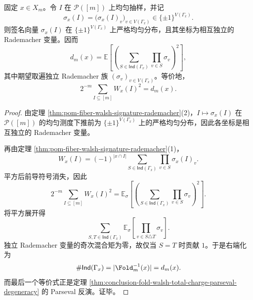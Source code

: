 \begin{theorem}\label{thm:conclusion-fold-rademacher-second-moment-degeneracy}
固定 \(x\in X_m\)。令 \(I\) 在 \(\mathcal P([m])\) 上均匀抽样，并记
\[
\sigma_x(I)=\bigl(\sigma_x(I)_v\bigr)_{v\in V(\Gamma_x)}\in\{\pm 1\}^{V(\Gamma_x)}.
\]
则签名向量 \(\sigma_x(I)\) 在 \(\{\pm 1\}^{V(\Gamma_x)}\) 上严格均匀分布，且其坐标为相互独立的 Rademacher 变量。因而
\[
\boxed{\;
d_m(x)
=
\mathbb E\!\left[
\left(
\sum_{S\in \mathsf{Ind}(\Gamma_x)}
\prod_{v\in S}\sigma_v
\right)^2
\right],\;}
\]
其中期望取遍独立 Rademacher 族 \((\sigma_v)_{v\in V(\Gamma_x)}\)。等价地，
\[
2^{-m}\sum_{I\subseteq[m]}W_x(I)^2=d_m(x).
\]
\end{theorem}
\begin{proof}
由定理 \ref{thm:pom-fiber-walsh-signature-rademacher}(2)，\(I\mapsto \sigma_x(I)\) 在 \(\mathcal P([m])\) 的均匀测度下推前为 \(\{\pm 1\}^{V(\Gamma_x)}\) 上的严格均匀分布，因此各坐标是相互独立的 Rademacher 变量。

再由定理 \ref{thm:pom-fiber-walsh-signature-rademacher}(1)，
\[
W_x(I)=(-1)^{|x\cap I|}
\sum_{S\in\mathsf{Ind}(\Gamma_x)}
\prod_{v\in S}\sigma_x(I)_v.
\]
平方后前导符号消失，因此
\[
2^{-m}\sum_{I\subseteq[m]}W_x(I)^2
=
\mathbb E_{\sigma}\!\left[
\left(
\sum_{S\in\mathsf{Ind}(\Gamma_x)}
\prod_{v\in S}\sigma_v
\right)^2
\right].
\]
将平方展开得
\[
\sum_{S,T\in\mathsf{Ind}(\Gamma_x)}
\mathbb E_{\sigma}\!\left[
\prod_{v\in S\triangle T}\sigma_v
\right].
\]
独立 Rademacher 变量的奇次混合矩为零，故仅当 \(S=T\) 时贡献 \(1\)。于是右端化为
\[
\#\mathsf{Ind}(\Gamma_x)=|\Fold_m^{-1}(x)|=d_m(x).
\]
而最后一个等价式正是定理 \ref{thm:conclusion-fold-walsh-total-charge-parseval-degeneracy} 的 Parseval 反演。证毕。
\end{proof}

